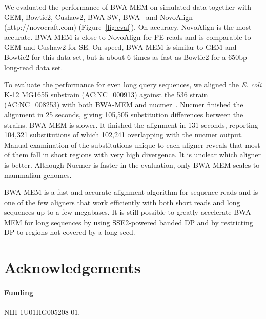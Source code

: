 \documentclass{bioinfo}
\begin{document}
We evaluated the performance of BWA-MEM on simulated data together with
GEM, Bowtie2, Cushaw2, BWA-SW, BWA~\citep{Li:2009uq} and NovoAlign
(http://novocraft.com) (Figure~\ref{fig:eval}). On accuracy, NovoAlign
is the most accurate. BWA-MEM is close to NovoAlign for PE reads
and is comparable to GEM and Cushaw2 for SE. On speed, BWA-MEM is similar to
GEM and Bowtie2 for this data set, but is about 6 times as fast as Bowtie2
for a 650bp long-read data set.

To evaluate the performance for even long query sequences, we aligned the {\it E. coli}
K-12 MG1655 substrain (AC:NC\_000913) against the 536 strain (AC:NC\_008253) with 
both BWA-MEM and nucmer~\citep{Kurtz:2004zr}. Nucmer finished the alignment in 25 seconds, giving
105,505 substitution differences between the strains. BWA-MEM is slower.
It finished the alignment in 131 seconds, reporting 104,321 substitutions of which 102,241
overlapping with the nucmer output. Manual examination of the
substitutions unique to each aligner reveals that most of them fall in short regions
with very high divergence. It is unclear which aligner is better. Although
Nucmer is faster in the evaluation, only BWA-MEM scales to mammalian genomes.

BWA-MEM is a fast and accurate alignment algorithm for sequence reads and is
one of the few aligners that work efficiently with both short reads and long sequences up
to a few megabases. It is still possible to greatly accelerate BWA-MEM for long
sequences by using SSE2-powered banded DP and by restricting DP to regions not
covered by a long seed.

\section{Acknowledgements}
\paragraph{Funding\textcolon} NIH 1U01HG005208-01.

\end{document}
